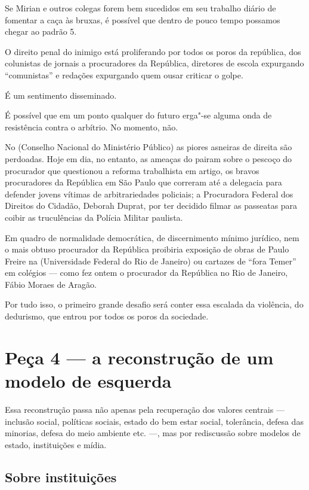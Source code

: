 Se Mirian e outros colegas forem bem sucedidos em seu trabalho diário de
fomentar a caça às bruxas, é possível que dentro de pouco tempo possamos
chegar ao padrão 5.

O direito penal do inimigo está proliferando por todos os poros da
república, dos colunistas de jornais a procuradores da República,
diretores de escola expurgando ``comunistas'' e redações expurgando quem
ousar criticar o golpe.~

É um sentimento disseminado.

É possível que em um ponto qualquer do futuro erga"-se alguma onda de
resistência contra o arbítrio. No momento, não.

No  (Conselho Nacional do Ministério Público) as piores asneiras de
direita são perdoadas. Hoje em dia, no entanto, as ameaças do 
pairam sobre o pescoço do procurador que questionou a reforma
trabalhista em artigo, os bravos procuradores da República em São Paulo
que correram até a delegacia para defender jovens vítimas de
arbitrariedades policiais; a Procuradora Federal dos Direitos do
Cidadão, Deborah Duprat, por ter decidido filmar as passeatas para
coibir as truculências da Polícia Militar paulista.

Em quadro de normalidade democrática, de discernimento mínimo jurídico,
nem o mais obtuso procurador da República proibiria exposição de obras
de Paulo Freire na  (Universidade Federal do Rio de Janeiro) ou
cartazes de ``fora Temer'' em colégios --- como fez ontem o procurador
da República no Rio de Janeiro, Fábio Moraes de Aragão.

Por tudo isso, o primeiro grande desafio será conter essa escalada da
violência, do dedurismo, que entrou por todos os poros da sociedade.

\section{Peça 4 --- a reconstrução de um modelo de esquerda}

Essa reconstrução passa não apenas pela recuperação dos valores centrais
--- inclusão social, políticas sociais, estado do bem estar social,
tolerância, defesa das minorias, defesa do meio ambiente etc. \mbox{---,} mas
por rediscussão sobre modelos de estado, instituições e mídia.

\subsection{\textbf{Sobre instituições}}

